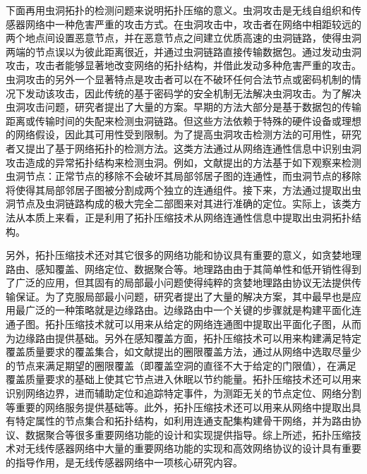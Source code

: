 下面再用虫洞拓扑的检测问题来说明拓扑压缩的意义。虫洞攻击是无线自组织和传感器网络中一种危害严重的攻击方式。在虫洞攻击中，攻击者在网络中相距较远的两个地点间设置恶意节点，并在恶意节点之间建立优质高速的虫洞链路，使得虫洞两端的节点误以为彼此距离很近，并通过虫洞链路直接传输数据包。通过发动虫洞攻击，攻击者能够显著地改变网络的拓扑结构，并借此发动多种危害严重的攻击。虫洞攻击的另外一个显著特点是攻击者可以在不破环任何合法节点或密码机制的情况下发动该攻击，因此传统的基于密码学的安全机制无法解决虫洞攻击。为了解决虫洞攻击问题，研究者提出了大量的方案。早期的方法大部分是基于数据包的传输距离或传输时间的失配来检测虫洞链路。但这些方法依赖于特殊的硬件设备或理想的网络假设，因此其可用性受到限制。为了提高虫洞攻击检测方法的可用性，研究者又提出了基于网络拓扑的检测方法。这类方法通过从网络连通性信息中识别虫洞攻击造成的异常拓扑结构来检测虫洞。例如，文献提出的方法基于如下观察来检测虫洞节点：正常节点的移除不会破坏其局部邻居子图的连通性，而虫洞节点的移除将使得其局部邻居子图被分割成两个独立的连通组件。接下来，方法通过提取出虫洞节点及虫洞链路构成的极大完全二部图来对其进行准确的定位。实际上，该类方法从本质上来看，正是利用了拓扑压缩技术从网络连通性信息中提取出虫洞拓扑结构。

另外，拓扑压缩技术还对其它很多的网络功能和协议具有重要的意义，如贪婪地理路由、感知覆盖、网络定位、数据聚合等。地理路由由于其简单性和低开销性得到了广泛的应用，但其固有的局部最小问题使得纯粹的贪婪地理路由协议无法提供传输保证。为了克服局部最小问题，研究者提出了大量的解决方案，其中最早也是应用最广泛的一种策略就是边缘路由。边缘路由中一个关键的步骤就是构建平面化连通子图。拓扑压缩技术就可以用来从给定的网络连通图中提取出平面化子图，从而为边缘路由提供基础。另外在感知覆盖方面，拓扑压缩技术可以用来构建满足特定覆盖质量要求的覆盖集合，如文献提出的圈限覆盖方法，通过从网络中选取尽量少的节点来满足期望的圈限覆盖（即覆盖空洞的直径不大于给定的门限值），在满足覆盖质量要求的基础上使其它节点进入休眠以节约能量。拓扑压缩技术还可以用来识别网络边界，进而辅助定位和追踪特定事件，为测距无关的节点定位、网络分割 等重要的网络服务提供基础等。此外，拓扑压缩技术还可以用来从网络中提取出具有特定属性的节点集合和拓扑结构，如利用连通支配集构建骨干网络，并为路由协议、数据聚合等很多重要网络功能的设计和实现提供指导。综上所述，拓扑压缩技术对无线传感器网络中大量的重要网络功能的实现和高效网络协议的设计具有重要的指导作用，是无线传感器网络中一项核心研究内容。

